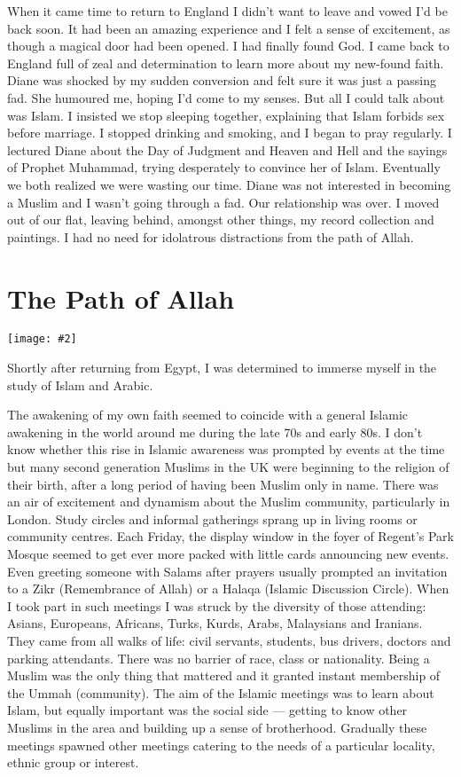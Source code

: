 \documentclass[12pt]{memoir}
\newcommand{\img}[3]{\begin{center}%
\texttt{[image: \#2]}\\{\small\em#3}%
\end{center}}
\begin{document}
When it came time to return to England I didn’t want to leave
and vowed I’d be back soon.
It had been an amazing experience and I felt a sense of excitement,
as though a magical door had been opened.
I had finally found God.
I came back to England full of zeal and determination
to learn more about my new-found faith.
Diane was shocked by my sudden conversion
and felt sure it was just a passing fad.
She humoured me, hoping I’d come to my senses.
But all I could talk about was Islam.
I insisted we stop sleeping together,
explaining that Islam forbids sex before marriage.
I stopped drinking and smoking, and I began to pray regularly.
I lectured Diane about the Day of Judgment and Heaven and Hell
and the sayings of Prophet Muhammad,
trying desperately to convince her of Islam.
Eventually we both realized we were wasting our time.
Diane was not interested in becoming a Muslim
and I wasn’t going through a fad.
Our relationship was over.
I moved out of our flat, leaving behind, amongst other things,
my record collection and paintings.
I had no need for idolatrous distractions from the path of Allah.


\chapter{The Path of Allah}

\img{scale=1}{Hassan_1980.jpg}{}

Shortly after returning from Egypt,
I was determined to immerse myself in the study of Islam and Arabic.

The awakening of my own faith seemed to coincide
with a general Islamic awakening in the world around me
during the late 70s and early 80s.
I don’t know whether this rise in Islamic awareness was prompted by events
at the time but many second generation Muslims in the UK
were beginning to  the religion of their birth,
after a long period of having been Muslim only in name.
There was an air of excitement and dynamism about the Muslim community,
particularly in London.
Study circles and informal gatherings sprang up
in living rooms or community centres.
Each Friday, the display window in the foyer of Regent’s Park Mosque
seemed to get ever more packed with little cards announcing new events.
Even greeting someone with Salams after prayers usually prompted an invitation
to a Zikr (Remembrance of Allah) or a Halaqa (Islamic Discussion Circle).
When I took part in such meetings
I was struck by the diversity of those attending:
Asians, Europeans, Africans, Turks, Kurds, Arabs, Malaysians and Iranians.
They came from all walks of life: civil servants, students, bus drivers,
doctors and parking attendants.
There was no barrier of race, class or nationality.
Being a Muslim was the only thing that mattered
and it granted instant membership of the Ummah (community).
The aim of the Islamic meetings was to learn about Islam,
but equally important was the social side —
getting to know other Muslims in the area
and building up a sense of brotherhood.
Gradually these meetings spawned other meetings
catering to the needs of a particular locality, ethnic group or interest.
\end{document}
